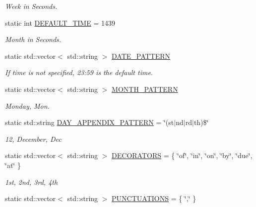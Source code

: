 \begin{DoxyCompactItemize}
\begin{DoxyCompactList}\small\item\em Week in Seconds. \end{DoxyCompactList}\item 
static int \hyperlink{class_do_lah_1_1_date_time_parser_a958ccfe724266321507056e0461a5a98}{D\+E\+F\+A\+U\+L\+T\+\_\+\+T\+I\+M\+E} = 1439
\begin{DoxyCompactList}\small\item\em Month in Seconds. \end{DoxyCompactList}\item 
static std\+::vector$<$ std\+::string $>$ \hyperlink{class_do_lah_1_1_date_time_parser_a315041bae4546ac4d88ba9ed955edceb}{D\+A\+T\+E\+\_\+\+P\+A\+T\+T\+E\+R\+N}
\begin{DoxyCompactList}\small\item\em If time is not specified, 23\+:59 is the default time. \end{DoxyCompactList}\item 
static std\+::vector$<$ std\+::string $>$ \hyperlink{class_do_lah_1_1_date_time_parser_ad713cbb4bea551075364247f8c09b08d}{M\+O\+N\+T\+H\+\_\+\+P\+A\+T\+T\+E\+R\+N}
\begin{DoxyCompactList}\small\item\em Monday, Mon. \end{DoxyCompactList}\item 
static std\+::string \hyperlink{class_do_lah_1_1_date_time_parser_ac3dd9a041853326af40af0a33dfd9974}{D\+A\+Y\+\_\+\+A\+P\+P\+E\+N\+D\+I\+X\+\_\+\+P\+A\+T\+T\+E\+R\+N} = \char`\"{}(st$\vert$nd$\vert$rd$\vert$th)\$\char`\"{}
\begin{DoxyCompactList}\small\item\em 12, December, Dec \end{DoxyCompactList}\item 
static std\+::vector$<$ std\+::string $>$ \hyperlink{class_do_lah_1_1_date_time_parser_a3e78cc57480f0d193e6c9e9a3683dc16}{D\+E\+C\+O\+R\+A\+T\+O\+R\+S} = \{ \char`\"{}of\char`\"{}, \char`\"{}in\char`\"{}, \char`\"{}on\char`\"{}, \char`\"{}by\char`\"{}, \char`\"{}due\char`\"{}, \char`\"{}at\char`\"{} \}
\begin{DoxyCompactList}\small\item\em 1st, 2nd, 3rd, 4th \end{DoxyCompactList}\item 
static std\+::vector$<$ std\+::string $>$ \hyperlink{class_do_lah_1_1_date_time_parser_a32a1a31cd10efd72ecfe55e89aea8ec4}{P\+U\+N\+C\+T\+U\+A\+T\+I\+O\+N\+S} = \{ \char`\"{},\char`\"{} \}

\end{DoxyCompactItemize}
